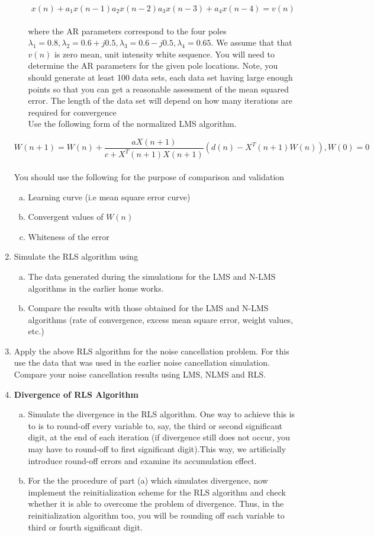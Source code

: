 \documentclass[journal,12pt,twocolumn]{IEEEtran}
\begin{document}
\begin{enumerate}
\begin{enumerate}[(a)]
$$x(n)+a_1{x}{(n-1)}a_2{x}{(n-2)}a_3{x}{(n-3)}+a_4{x}{(n-4)}=v(n)$$\\
where the AR parameters correspond to the four poles $\lambda_1=0.8,\lambda_2=0.6 +j{0.5},\lambda_3=0.6−j{0.5},\lambda_4= 0.65.$ We
assume that that $v(n)$ is zero mean, unit intensity white sequence. You will need to determine the AR parameters for
the given pole locations. Note, you should generate at least 100 data sets, each data set having large enough points
so that you can get a reasonable assessment of the mean squared error. The length of the data set will depend on
how many iterations are required for convergence\\
\smallskip
Use the following form of the normalized LMS algorithm.
\end{enumerate}
\medskip
$$W(n+1)=W(n)+\frac{aX(n+1)}{c+X^T(n+1)X(n+1)}(d(n)-X^T{(n+1)}W(n)),W(0)=0$$\\
\medskip
You should use the following for the purpose of comparison and validation\\
\begin{enumerate}[(a)]
\medskip
\item Learning curve (i.e mean square error curve)
\item Convergent values of $W(n)$
\item Whiteness of the error
\end{enumerate}
\item Simulate the RLS algorithm using
\begin{enumerate}[(a)]
\item The data generated during the simulations for the LMS and N-LMS algorithms in the earlier home works.
\item Compare the results with those obtained for the LMS and N-LMS algorithms (rate of convergence, excess
mean square error, weight values, etc.)
\end{enumerate}
\medskip
\item Apply the above RLS algorithm for the noise cancellation problem. For this use the data that was used in the earlier
noise cancellation simulation. Compare your noise cancellation results using LMS, NLMS and RLS.
\medskip
\item \textbf{Divergence of RLS Algorithm}
\medskip
\begin{enumerate}[(a)]
\item Simulate the divergence in the RLS algorithm. One way to achieve this is to is to round-off every variable
to, say, the third or second significant digit, at the end of each iteration (if divergence still does not occur,
you may have to round-off to first significant digit).This way, we artificially introduce round-off errors and
examine its accumulation effect.
\smallskip
\item For the the procedure of part (a) which simulates divergence, now implement the reinitialization scheme
for the RLS algorithm and check whether it is able to overcome the problem of divergence. Thus, in the reinitialization algorithm too, you will be rounding off each variable to third or fourth significant digit.
\end{enumerate}
\end{enumerate}
\end{document}
